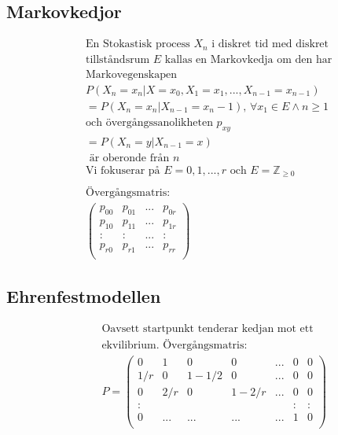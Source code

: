 \begin{multicols}{2}
\section{Markovkedjor}
\begin{align*}
  &\text{En Stokastisk process ${X_n}$ i diskret tid med diskret} \\
  &\text{tillståndsrum $E$ kallas en Markovkedja om den har} \\
  &\text{Markovegenskapen} \\
  &P(X_n=x_n|X=x_0,X_1=x_1,...,X_{n-1}=x_{n-1}) \\
  &= P(X_n=x_n|X_{n-1}=x_n-1), \, \forall x_1\in{E} \land n\geq1 \\
  &\text{och övergångssanolikheten } p_{xy} \\
  &=P(X_n=y|X_{n-1}=x) \\
  &\text{ är oberonde från $n$} \\
  &\text{Vi fokuserar på } E={0,1,...,r} \text{ och } E=\mathbb{Z}_{\geq0} \\
  & \\
  &\text{Övergångsmatris:} \\
  &\left(\begin{array}{cccc}
    p_{00} & p_{01} & ... & p_{0r} \\
    p_{10} & p_{11} & ... & p_{1r} \\
    : & : & ... & : \\
    p_{r0} & p_{r1} & ... & p_{rr} \\
  \end{array}\right)
\end{align*}

\subsection{Ehrenfestmodellen}
\begin{align*}
  &\quad  \text{Oavsett startpunkt tenderar kedjan mot ett} \\
  &\quad  \text{ekvilibrium. Övergångsmatris:} \\
  &\quad  P=
  \left(\begin{array}{ccccccc}
    0 & 1 & 0 & 0 & ... & 0 & 0 \\
    1/r & 0 & 1-1/2 & 0 & ... & 0 & 0 \\
    0 & 2/r & 0 & 1-2/r & ... & 0 & 0 \\
    : &  &  &  &  & : & : \\
    0 & ... & ... & ... & ... & 1 & 0 \\
  \end{array}\right) \\
\end{align*}


\end{multicols}

